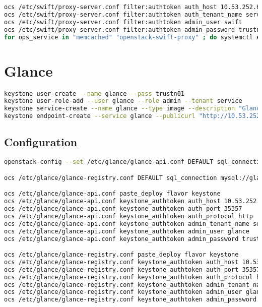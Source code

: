 \documentclass[11pt,letterpaper,oneside]{book}
\begin{document}
\begin{lstlisting}[caption={Swift Proxy},language=bash]
ocs /etc/swift/proxy-server.conf filter:authtoken auth_host 10.53.252.61
ocs /etc/swift/proxy-server.conf filter:authtoken auth_tenant_name service
ocs /etc/swift/proxy-server.conf filter:authtoken admin_user swift
ocs /etc/swift/proxy-server.conf filter:authtoken admin_password trustn01
for ops_service in "memcached" "openstack-swift-proxy" ; do systemctl enable $ops_service; systemctl start $ops_service; done
\end{lstlisting}


\chapter{Glance}

\begin{lstlisting}[caption={Glance Keystone create},language=bash]
keystone user-create --name glance --pass trustn01
keystone user-role-add --user glance --role admin --tenant service
keystone service-create --name glance --type image --description "Glance Image Service"
keystone endpoint-create --service glance --publicurl "http://10.53.252.61:9292" --adminurl "http://10.53.252.61:9292" --internalurl "http://10.53.252.61:9292"
\end{lstlisting}

\section{Configuration}
\begin{lstlisting}[caption={foo},language=bash]
openstack-config --set /etc/glance/glance-api.conf DEFAULT sql_connection mysql://glance:trustn01@10.53.252.61/glance

ocs /etc/glance/glance-registry.conf DEFAULT sql_connection mysql://glance:trustn01@10.53.252.61/glance

ocs /etc/glance/glance-api.conf paste_deploy flavor keystone
ocs /etc/glance/glance-api.conf keystone_authtoken auth_host 10.53.252.61
ocs /etc/glance/glance-api.conf keystone_authtoken auth_port 35357
ocs /etc/glance/glance-api.conf keystone_authtoken auth_protocol http
ocs /etc/glance/glance-api.conf keystone_authtoken admin_tenant_name service
ocs /etc/glance/glance-api.conf keystone_authtoken admin_user glance
ocs /etc/glance/glance-api.conf keystone_authtoken admin_password trustn01

ocs /etc/glance/glance-registry.conf paste_deploy flavor keystone
ocs /etc/glance/glance-registry.conf keystone_authtoken auth_host 10.53.252.61
ocs /etc/glance/glance-registry.conf keystone_authtoken auth_port 35357
ocs /etc/glance/glance-registry.conf keystone_authtoken auth_protocol http
ocs /etc/glance/glance-registry.conf keystone_authtoken admin_tenant_name service
ocs /etc/glance/glance-registry.conf keystone_authtoken admin_user glance
ocs /etc/glance/glance-registry.conf keystone_authtoken admin_password trustn01
\end{lstlisting}
\end{document}
